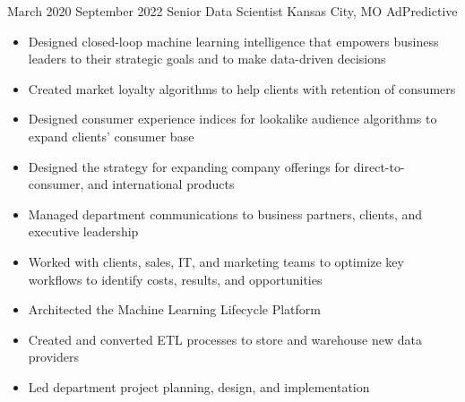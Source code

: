 
\Experience
{March 2020}
{September 2022}
{Senior Data Scientist}
{Kansas City, MO}
{AdPredictive}
{\begin{itemize}
     \item Designed closed-loop machine learning intelligence that empowers business leaders to their strategic goals and to make data-driven decisions
     \item Created market loyalty algorithms to help clients with retention of consumers
     \item Designed consumer experience indices for lookalike audience algorithms to expand clients' consumer base
     \item Designed the strategy for expanding company offerings for direct-to-consumer, and international products
     \item Managed department communications to business partners, clients, and executive leadership
     \item Worked with clients, sales, IT, and marketing teams to optimize key workflows to identify costs, results, and opportunities
     \item Architected the Machine Learning Lifecycle Platform
     \item Created and converted ETL processes to store and warehouse new data providers
     \item Led department project planning, design, and implementation
\end{itemize}}

\vspace*{0.05 in}

